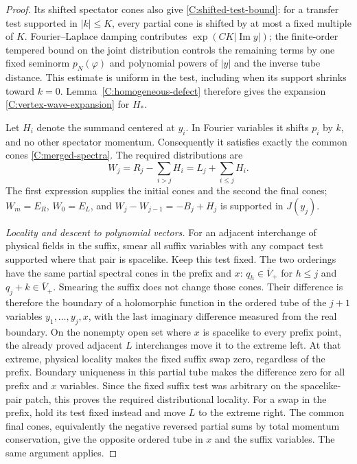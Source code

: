 \begin{proof}
Its shifted spectator cones also give
\eqref{C:shifted-test-bound}: for a transfer test supported in
$|k|\le K$, every partial cone is shifted by at most a fixed multiple
of $K$. Fourier--Laplace damping contributes
$\exp(CK|\operatorname{Im}y|)$; the finite-order tempered bound on the
joint distribution controls the remaining terms by one fixed seminorm
$p_N(\varphi)$ and polynomial powers of $|y|$ and the inverse tube
distance. This estimate is uniform in the test, including when its
support shrinks toward $k=0$. Lemma~\ref{C:homogeneous-defect} therefore
gives the expansion \eqref{C:vertex-wave-expansion} for $H_*$.

Let $H_i$ denote the summand centered at $y_i$. In Fourier variables
it shifts $p_i$ by $k$, and no other spectator momentum. Consequently
it satisfies exactly the common cones
\eqref{C:merged-spectra}. The required distributions are
\begin{equation}\label{C:Wj}
 W_j=R_j-\sum_{i>j}H_i
     =L_j+\sum_{i\le j}H_i.
\end{equation}
The first expression supplies the initial cones and the second the
final cones; $W_m=E_R$, $W_0=E_L$, and
$W_j-W_{j-1}=-B_j+H_j$ is supported in $J(y_j)$.

\emph{Locality and descent to polynomial vectors.}
For an adjacent interchange of physical fields in the suffix,
smear all suffix variables with any compact test supported where
that pair is spacelike. Keep this test fixed. The two orderings
have the same partial spectral cones in the prefix and $x$:
$q_h\in\overline V_+$ for $h\le j$ and
$q_j+k\in\overline V_+$. Smearing the suffix does not change
those cones. Their difference is therefore the boundary of a
holomorphic function in the ordered tube of the $j+1$ variables
$y_1,\ldots,y_j,x$, with the last imaginary difference measured
from the real boundary. On the nonempty open set where $x$ is
spacelike to every prefix point, the already proved adjacent
$L$ interchanges move it to the extreme left. At that extreme,
physical locality makes the fixed suffix swap zero, regardless
of the prefix. Boundary uniqueness in this partial tube makes
the difference zero for all prefix and $x$ variables. Since the
fixed suffix test was arbitrary on the spacelike-pair patch,
this proves the required distributional locality. For a swap
in the prefix, hold its test fixed instead and move $L$ to the
extreme right. The common final cones, equivalently the negative
reversed partial sums by total momentum conservation, give the
opposite ordered tube in $x$ and the suffix variables. The same
argument applies.


\end{proof}
